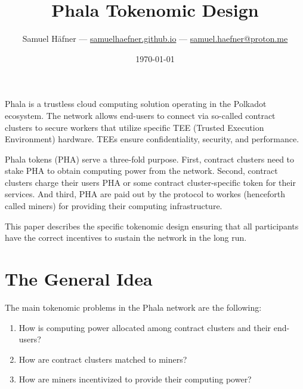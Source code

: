\documentclass[11pt, a4paper, twocolumn]{article}
\begin{document}
	\title{Phala Tokenomic Design}
	\author{Samuel Häfner --- \href{https:\\samuelhaefner.github.io}{samuelhaefner.github.io} --- \href{mailto:samuel.haefner@protonmail.com}{samuel.haefner@proton.me}}
	\date{\today}
	
	\maketitle

	
Phala is a trustless cloud computing solution operating in the Polkadot ecosystem. The network allows end-users to connect via so-called contract clusters to secure workers that utilize specific TEE (Trusted Execution Environment) hardware. TEEs ensure confidentiality, security, and performance.

Phala tokens (PHA) serve a three-fold purpose. First, contract clusters need to stake PHA to obtain computing power from the network. Second, contract clusters charge their users PHA or some contract cluster-specific token for their services. And third, PHA are paid out by the protocol to workes (henceforth called miners)  for providing their computing infrastructure. 

This paper describes the specific tokenomic design ensuring that all participants have the correct incentives to sustain the network in the long run. 


\section{The General Idea} 
The main tokenomic problems in the Phala network are the following: 
%
\begin{enumerate}
	\item How is computing power allocated among contract clusters and their end-users?
	\item How are contract clusters matched to miners?
	\item How are miners incentivized to provide their computing power?
\end{enumerate}


\end{document}
